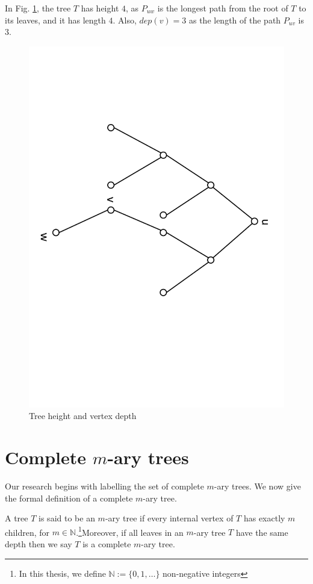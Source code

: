 \begin{example}
In Fig. \ref{height and depth}, the tree $T$ has height $4$, as $P_{uw}$ is the longest path from the root of $T$ to its leaves, and it has length $4$. Also, $dep(v) = 3$ as the length of the path $P_{uv}$ is $3$. 

\begin{figure}
  \centering
      \vspace{-10pt}
    \includegraphics[scale=0.3, angle=90]{../figures/fig2-3.pdf}
        \vspace{-0pt}
  \caption{Tree height and vertex depth}
  \label{height and depth}
\end{figure}
\end{example}


\section{Complete $m$-ary trees}
Our research begins with labelling the set of complete $m$-ary trees. We now give the formal definition of a complete $m$-ary tree. 
\begin{definition}
\label{m-ary tree}
A tree $T$ is said to be an $m$-ary tree if every internal vertex  of $T$ has exactly $m$ children, for $m \in \mathbb{N}$.\footnote{In this thesis, we define $\mathbb{N}:=\{0, 1, \dots\}$ non-negative integers}Moreover, if all leaves in an $m$-ary tree $T$ have the same depth then we say $T$ is a complete $m$-ary tree. 
\end{definition}

